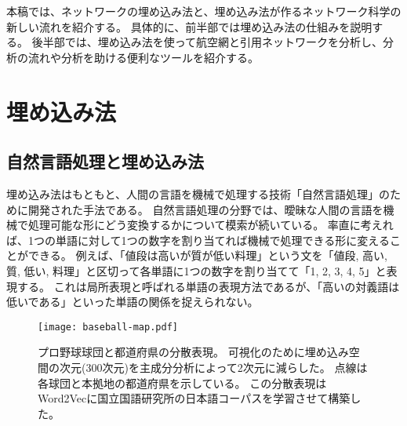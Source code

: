 \documentclass[12pt]{jarticle}
\def\ddash{\rule[0.33zh]{2zw}{.03zh}}
\begin{document}

本稿では、ネットワークの埋め込み法と、埋め込み法が作るネットワーク科学の新しい流れを紹介する。
具体的に、前半部では埋め込み法の仕組みを説明する。
後半部では、埋め込み法を使って航空網と引用ネットワークを分析し、分析の流れや分析を助ける便利なツールを紹介する。

\section{埋め込み法}

\subsection{自然言語処理と埋め込み法}

埋め込み法はもともと、人間の言語を機械で処理する技術「自然言語処理」のために開発された手法である。
自然言語処理の分野では、曖昧な人間の言語を機械で処理可能な形にどう変換するかについて模索が続いている。
率直に考えれば、1つの単語に対して1つの数字を割り当てれば機械で処理できる形に変えることができる。
例えば、「値段は高いが質が低い料理」という文を「値段, 高い, 質, 低い, 料理」と区切って各単語に1つの数字を割り当てて「1, 2, 3, 4, 5」と表現する。
これは局所表現と呼ばれる単語の表現方法であるが、「高いの対義語は低いである」といった単語の関係を捉えられない。

\begin{figure}
    \centering
    \texttt{[image: baseball-map.pdf]}
    \caption{
        プロ野球球団と都道府県の分散表現。
        可視化のために埋め込み空間の次元(300次元)を主成分分析によって2次元に減らした。
        点線は各球団と本拠地の都道府県を示している。
        この分散表現はWord2Vecに国立国語研究所の日本語コーパスを学習させて構築した\protect\cite{kawamura2020chive}。
    }
    \label{fig:baseballmap}
\end{figure}
\end{document}
